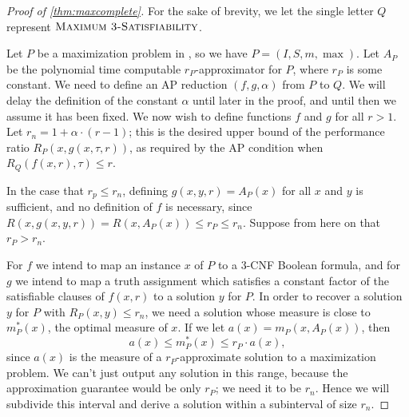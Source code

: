 \documentclass[]{article}
\theoremstyle{plain}
\theoremstyle{definition}
\begin{document}
\begin{proof}[Proof of \autoref{thm:maxcomplete}]
  For the sake of brevity, we let the single letter $Q$ represent $\textsc{Maximum 3-Satisfiability}$.

  Let $P$ be a maximization problem in \APX, so we have $P = (I, S, m, \max)$.
  Let $A_P$ be the polynomial time computable $r_P$-approximator for $P$, where $r_P$ is some constant.
  We need to define an AP reduction $(f, g, \alpha)$ from $P$ to $Q$.
  We will delay the definition of the constant $\alpha$ until later in the proof, and until then we assume it has been fixed.
  We now wish to define functions $f$ and $g$ for all $r > 1$.
  Let $r_n = 1 + \alpha \cdot (r - 1)$; this is the desired upper bound of the performance ratio $R_P(x, g(x, \tau, r))$, as required by the AP condition when $R_Q(f(x, r), \tau) \leq r$.

  In the case that $r_p \leq r_n$, defining $g(x, y, r) = A_P(x)$ for all $x$ and $y$ is sufficient, and no definition of $f$ is necessary, since $R(x, g(x, y, r)) = R(x, A_P(x)) \leq r_P \leq r_n$.
  Suppose from here on that $r_P > r_n$.

  For $f$ we intend to map an instance $x$ of $P$ to a 3-CNF Boolean formula, and for $g$ we intend to map a truth assignment which satisfies a constant factor of the satisfiable clauses of $f(x, r)$ to a solution $y$ for $P$.
  In order to recover a solution $y$ for $P$ with $R_P(x, y) \leq r_n$, we need a solution whose measure is close to $m^*_P(x)$, the optimal measure of $x$.
  If we let $a(x) = m_P(x, A_P(x))$, then
  \begin{equation}\label{eq:bounds}
    a(x) \leq m^*_P(x) \leq r_P \cdot a(x),
  \end{equation}
  since $a(x)$ is the measure of a $r_P$-approximate solution to a maximization problem.
  We can't just output any solution in this range, because the approximation guarantee would be only $r_P$; we need it to be $r_n$.
  Hence we will subdivide this interval and derive a solution within a subinterval of size $r_n$.


\end{proof}
\end{document}
